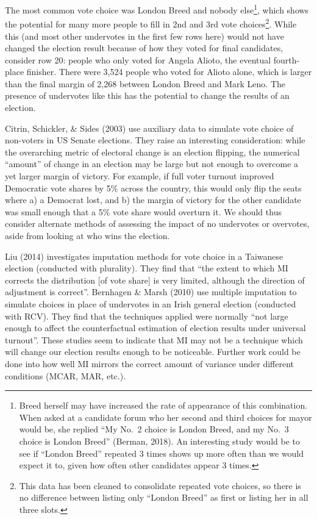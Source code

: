 \documentclass[12pt,twoside]{reedthesis}
\begin{document}
The most common vote choice was London Breed and nobody else\footnote{Breed herself may have increased the rate of appearance of this combination. When asked at a candidate forum who her second and third choices for mayor would be, she replied ``My No.~2 choice is London Breed, and my No.~3 choice is London Breed'' (Berman, 2018). An interesting study would be to see if ``London Breed'' repeated 3 times shows up more often than we would expect it to, given how often other candidates appear 3 times.}, which shows the potential for many more people to fill in 2nd and 3rd vote choices\footnote{This data has been cleaned to consolidate repeated vote choices, so there is no difference between listing only ``London Breed'' as first or listing her in all three slots.}. While this (and most other undervotes in the first few rows here) would not have changed the election result because of how they voted for final candidates, consider row 20: people who only voted for Angela Alioto, the eventual fourth-place finisher. There were 3,524 people who voted for Alioto alone, which is larger than the final margin of 2,268 between London Breed and Mark Leno. The presence of undervotes like this has the potential to change the results of an election.

Citrin, Schickler, \& Sides (2003) use auxiliary data to simulate vote choice of non-voters in US Senate elections. They raise an interesting consideration: while the overarching metric of electoral change is an election flipping, the numerical ``amount'' of change in an election may be large but not enough to overcome a yet larger margin of victory. For example, if full voter turnout improved Democratic vote shares by 5\% across the country, this would only flip the seats where a) a Democrat lost, and b) the margin of victory for the other candidate was small enough that a 5\% vote share would overturn it. We should thus consider alternate methods of assessing the impact of no undervotes or overvotes, aside from looking at who wins the election.

Liu (2014) investigates imputation methods for vote choice in a Taiwanese election (conducted with plurality). They find that ``the extent to which MI corrects the distribution {[}of vote share{]} is very limited, although the direction of adjustment is correct''. Bernhagen \& Marsh (2010) use multiple imputation to simulate choices in place of undervotes in an Irish general election (conducted with RCV). They find that the techniques applied were normally ``not large enough to affect the counterfactual estimation of election results under universal turnout''. These studies seem to indicate that MI may not be a technique which will change our election results enough to be noticeable. Further work could be done into how well MI mirrors the correct amount of variance under different conditions (MCAR, MAR, etc.).
\end{document}
